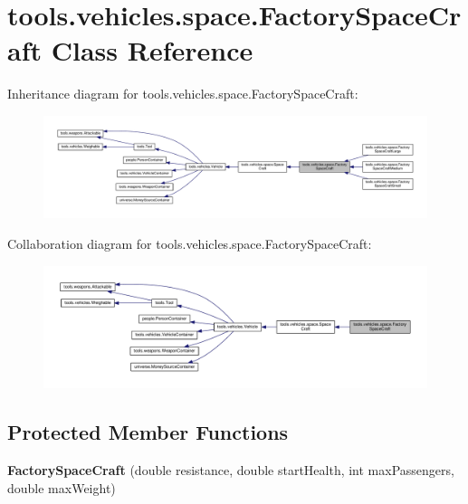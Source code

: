 \hypertarget{classtools_1_1vehicles_1_1space_1_1_factory_space_craft}{}\section{tools.\+vehicles.\+space.\+Factory\+Space\+Craft Class Reference}
\label{classtools_1_1vehicles_1_1space_1_1_factory_space_craft}


Inheritance diagram for tools.\+vehicles.\+space.\+Factory\+Space\+Craft\+:
\nopagebreak
\begin{figure}[H]
\begin{center}
\leavevmode
\includegraphics[width=350pt]{classtools_1_1vehicles_1_1space_1_1_factory_space_craft__inherit__graph}
\end{center}
\end{figure}


Collaboration diagram for tools.\+vehicles.\+space.\+Factory\+Space\+Craft\+:
\nopagebreak
\begin{figure}[H]
\begin{center}
\leavevmode
\includegraphics[width=350pt]{classtools_1_1vehicles_1_1space_1_1_factory_space_craft__coll__graph}
\end{center}
\end{figure}
\subsection*{Protected Member Functions}
\begin{DoxyCompactItemize}
\item 
{\bfseries Factory\+Space\+Craft} (double resistance, double start\+Health, int max\+Passengers, double max\+Weight)\hypertarget{classtools_1_1vehicles_1_1space_1_1_factory_space_craft_ac3096a0068d0834d6f8d44c483d5a83b}{}\label{classtools_1_1vehicles_1_1space_1_1_factory_space_craft_ac3096a0068d0834d6f8d44c483d5a83b}

\end{DoxyCompactItemize}
